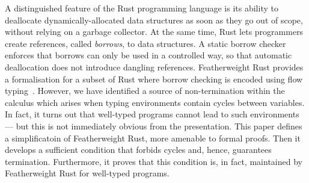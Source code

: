A distinguished feature of the Rust programming language is its
ability to deallocate dynamically-allocated data structures as soon as
they go out of scope, without relying on a garbage collector. At the
same time, Rust lets programmers create references, called
\emph{borrows}, to data structures. A static borrow checker enforces
that borrows can only be used in a controlled way, so that automatic
deallocation does not introduce dangling references.  Featherweight
Rust provides a formalisation for a subset of Rust where borrow
checking is encoded using flow typing~\cite{Pea21}.  However, we have
identified a source of non-termination within the calculus which
arises when typing environments contain cycles between variables.  In
fact, it turns out that well-typed programs cannot lead to such
environments --- but this is not immediately obvious from the
presentation.  This paper defines a simplificatoin of Featherweight
Rust, more amenable to formal proofs. Then it develops a sufficient
condition that forbids cycles and, hence, guarantees termination.
Furthermore, it proves that this condition is, in fact, maintained by
Featherweight Rust for well-typed programs.
